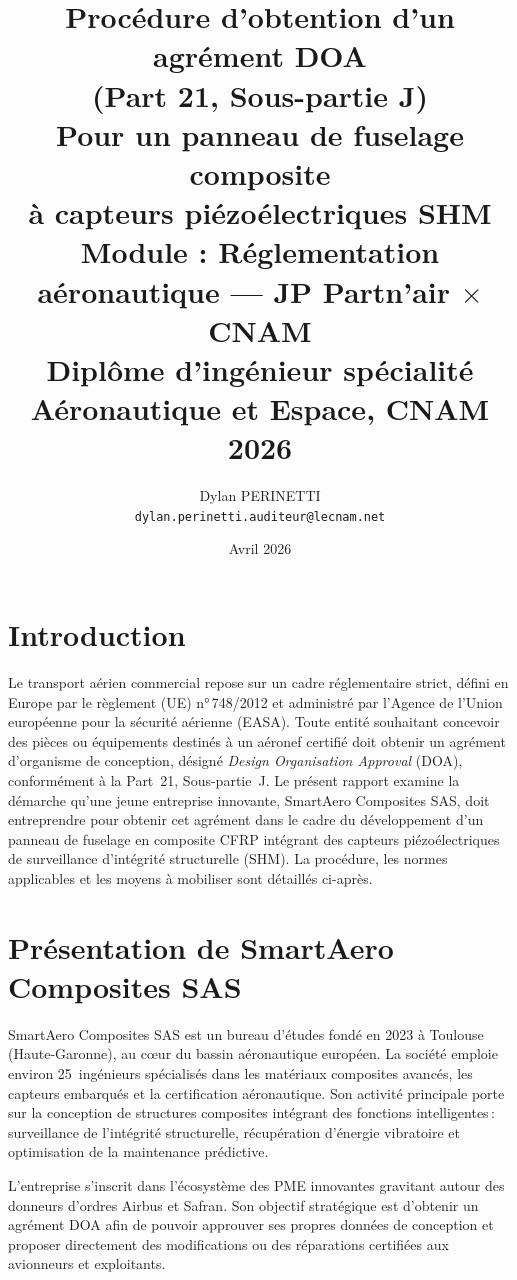 \documentclass[12pt,a4paper]{article}
\title{
    \vspace{-1cm}
    \textbf{Procédure d'obtention d'un agrément DOA\\(Part 21, Sous-partie J)}\\[0.5cm]
    \large Pour un panneau de fuselage composite\\à capteurs piézoélectriques SHM\\[1cm]
    \normalsize Module : Réglementation aéronautique — JP Partn'air $\times$ CNAM\\
    Diplôme d'ingénieur spécialité Aéronautique et Espace, CNAM 2026
}
\author{Dylan PERINETTI\\ \small\texttt{dylan.perinetti.auditeur@lecnam.net}}
\date{Avril 2026}
\begin{document}
\maketitle
\thispagestyle{empty}

\newpage
\tableofcontents
\newpage

\section{Introduction}

Le transport aérien commercial repose sur un cadre réglementaire strict, défini en Europe par le règlement (UE) n°\,748/2012 et administré par l'Agence de l'Union européenne pour la sécurité aérienne (EASA). Toute entité souhaitant concevoir des pièces ou équipements destinés à un aéronef certifié doit obtenir un agrément d'organisme de conception, désigné \textit{Design Organisation Approval} (DOA), conformément à la Part~21, Sous-partie~J. Le présent rapport examine la démarche qu'une jeune entreprise innovante, SmartAero Composites SAS, doit entreprendre pour obtenir cet agrément dans le cadre du développement d'un panneau de fuselage en composite CFRP intégrant des capteurs piézoélectriques de surveillance d'intégrité structurelle (SHM). La procédure, les normes applicables et les moyens à mobiliser sont détaillés ci-après.

\section{Présentation de SmartAero Composites SAS}

SmartAero Composites SAS est un bureau d'études fondé en 2023 à Toulouse (Haute-Garonne), au c\oe ur du bassin aéronautique européen. La société emploie environ 25~ingénieurs spécialisés dans les matériaux composites avancés, les capteurs embarqués et la certification aéronautique. Son activité principale porte sur la conception de structures composites intégrant des fonctions intelligentes\,: surveillance de l'intégrité structurelle, récupération d'énergie vibratoire et optimisation de la maintenance prédictive.

L'entreprise s'inscrit dans l'écosystème des PME innovantes gravitant autour des donneurs d'ordres Airbus et Safran. Son objectif stratégique est d'obtenir un agrément DOA afin de pouvoir approuver ses propres données de conception et proposer directement des modifications ou des réparations certifiées aux avionneurs et exploitants.
\end{document}
